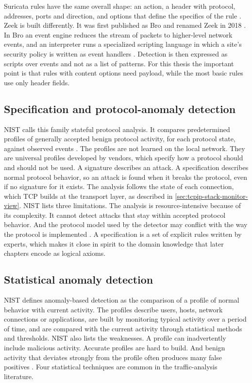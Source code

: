 Suricata rules have the same overall shape: an action, a header with
protocol, addresses, ports and direction, and options that define the
specifics of the rule \citep{suricata2026rules}. Zeek is built differently.
It was first published as Bro \citep{paxson1998bro} and renamed Zeek in 2018
\citep{zeek2018rename}. In Bro an event engine reduces the stream of packets
to higher-level network events, and an interpreter runs a specialized
scripting language in which a site's security policy is written as event
handlers \citep{paxson1998bro}. Detection is then expressed as scripts over
events and not as a list of patterns. For this thesis the important point is
that rules with content options need payload, while the most basic rules use
only header fields.

\subsection{Specification and protocol-anomaly detection}
\label{sec:specification-protocol-anomaly}

NIST calls this family stateful protocol analysis. It compares predetermined
profiles of generally accepted benign protocol activity, for each protocol
state, against observed events \citep{scarfone2007nist80094}. The profiles are
not learned on the local network. They are universal profiles developed by
vendors, which specify how a protocol should and should not be used. A
signature describes an attack. A specification describes normal protocol
behavior, so an attack is found when it breaks the protocol, even if no
signature for it exists. The analysis follows the state of each connection,
which TCP builds at the transport layer, as described in
\cref{sec:tcpip-stack-monitor-view}. NIST lists three limitations. The
analysis is resource-intensive because of its complexity. It cannot detect
attacks that stay within accepted protocol behavior. And the protocol model
used by the detector may conflict with the way the protocol is implemented
\citep{scarfone2007nist80094}. A specification is a set of explicit rules
written by experts, which makes it close in spirit to the domain knowledge
that later chapters encode as logical axioms.

\subsection{Statistical anomaly detection}
\label{sec:statistical-anomaly-detection}

NIST defines anomaly-based detection as the comparison of a profile of normal
behavior with current activity. The profiles describe users, hosts, network
connections or applications, are built by monitoring typical activity over a
period of time, and are compared with the current activity through
statistical methods and thresholds. NIST also lists the weaknesses. A profile
can inadvertently include malicious activity. Accurate profiles are hard to
build. And benign activity that deviates strongly from the profile often
produces many false positives \citep{scarfone2007nist80094}. Four
statistical techniques are common in the traffic-analysis literature.

